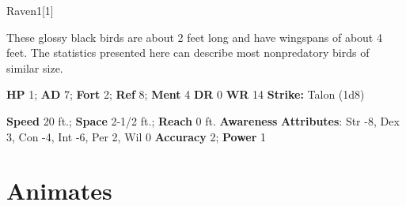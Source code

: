   
  \begin{monsection}{Raven}{1}[1]
    \vspace{-1em}\vspace{-1em}
    \vspace{0em}

    
      These glossy black birds are about 2 feet long and have wingspans of about 4 feet.
      The statistics presented here can describe most nonpredatory birds of similar size.
    

    \begin{spellcontent}
      \begin{spelltargetinginfo}
        \pari \textbf{HP} 1;
          \textbf{AD} 7;
          \textbf{Fort} 2;
          \textbf{Ref} 8;
          \textbf{Ment} 4
        \pari \textbf{DR} 0
        \pari \textbf{WR} 14
        \pari \textbf{Strike:}
            Talon  (1d8)
      \end{spelltargetinginfo}
    \end{spellcontent}
    \begin{monsterfooter}
      \pari \textbf{Speed} 20 ft.;
        \textbf{Space} 2-1/2 ft.;
        \textbf{Reach} 0 ft.
      \pari \textbf{Awareness} 
      \pari \textbf{Attributes}:
        Str -8, Dex 3,
        Con -4, Int -6,
        Per 2, Wil 0
      \pari \textbf{Accuracy} 2;
        \textbf{Power} 1
    \end{monsterfooter}
  \end{monsection}
  
  
        \section{Animates}
      

